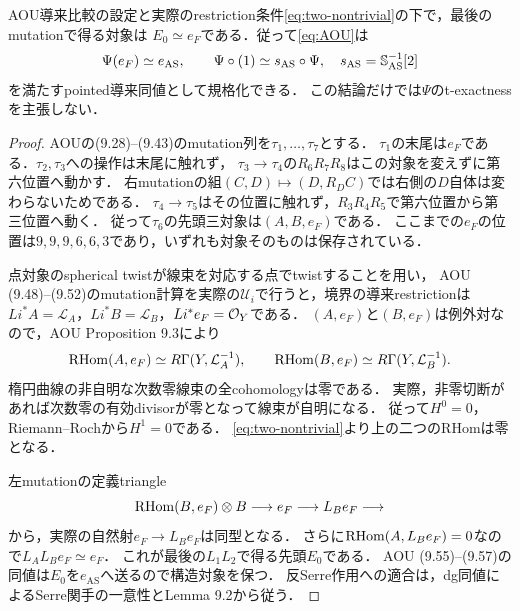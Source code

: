 \begin{theorem}[AOUの構造対象の同定]\label{thm:AOU-pointed}
AOU導来比較の設定と実際のrestriction条件\eqref{eq:two-nontrivial}の下で，最後のmutationで得る対象は
$E_0\simeq e_F$である．従って\eqref{eq:AOU}は
\[
\Psi(e_F)\simeq e_{\mathrm{AS}},\qquad
\Psi\circ(1)\simeq s_{\mathrm{AS}}\circ\Psi,
\quad s_{\mathrm{AS}}=\mathbb S_{\mathrm{AS}}^{-1}[2]
\]
を満たすpointed導来同値として規格化できる．
この結論だけでは$\Psi$のt-exactnessを主張しない．
\end{theorem}
\begin{proof}
AOUの(9.28)--(9.43)のmutation列を$\tau_1,\ldots,\tau_7$とする．
$\tau_1$の末尾は$e_F$である．$\tau_2,\tau_3$への操作は末尾に触れず，
$\tau_3\to\tau_4$の$R_6R_7R_8$はこの対象を変えずに第六位置へ動かす．
右mutationの組$(C,D)\mapsto(D,R_D C)$では右側の$D$自体は変わらないためである．
$\tau_4\to\tau_5$はその位置に触れず，$R_3R_4R_5$で第六位置から第三位置へ動く．
従って$\tau_6$の先頭三対象は$(A,B,e_F)$である．
ここまでの$e_F$の位置は$9,9,9,6,6,3$であり，いずれも対象そのものは保存されている．

点対象のspherical twistが線束を対応する点でtwistすることを用い，
AOU (9.48)--(9.52)のmutation計算を実際の$\mathcal U_i$で行うと，境界の導来restrictionは
$Li^*A=\mathcal L_A$，$Li^*B=\mathcal L_B$，$Li^*e_F=\mathcal O_Y$である．
$(A,e_F)$と$(B,e_F)$は例外対なので，AOU Proposition 9.3により
\[
\operatorname{RHom}(A,e_F)\simeq R\Gamma(Y,\mathcal L_A^{-1}),\qquad
\operatorname{RHom}(B,e_F)\simeq R\Gamma(Y,\mathcal L_B^{-1}).
\]
楕円曲線の非自明な次数零線束の全cohomologyは零である．
実際，非零切断があれば次数零の有効divisorが零となって線束が自明になる．
従って$H^0=0$，Riemann--Rochから$H^1=0$である．
\eqref{eq:two-nontrivial}より上の二つのRHomは零となる．

左mutationの定義triangle
\[
\operatorname{RHom}(B,e_F)\otimes B\longrightarrow e_F
\longrightarrow L_Be_F\longrightarrow
\]
から，実際の自然射$e_F\to L_Be_F$は同型となる．
さらに$\operatorname{RHom}(A,L_Be_F)=0$なので$L_A L_Be_F\simeq e_F$．
これが最後の$L_1L_2$で得る先頭$E_0$である．
AOU (9.55)--(9.57)の同値は$E_0$を$e_{\mathrm{AS}}$へ送るので構造対象を保つ．
反Serre作用への適合は，dg同値によるSerre関手の一意性とLemma 9.2から従う．
\end{proof}

